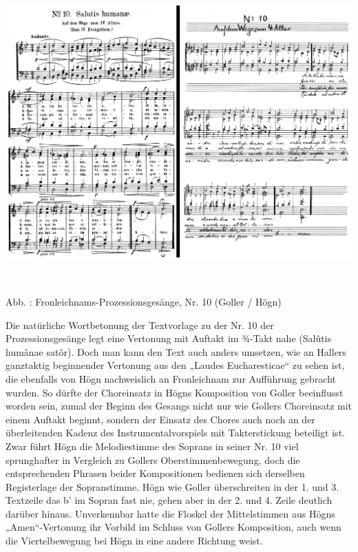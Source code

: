 \documentclass[a4paper]{article}
\newcounter{Abb}
\renewcommand\theAbb{\arabic{Abb}}
\begin{document}
\includegraphics[width=15.967cm,height=11.599cm]{pictures/zulassungsarbeit-img084.png}


Abb. \stepcounter{Abb}{\theAbb}: Fronleichnams-Prozessionsgesänge, Nr.
10 (Goller / Högn)

Die natürliche Wortbetonung der Textvorlage zu der Nr. 10 der
Prozessionsgesänge legt eine Vertonung mit Auftakt im ¾-Takt nahe
(Salûtis humânae satôr). Doch man kann den Text auch anders umsetzen,
wie an Hallers ganztaktig beginnender Vertonung aus den „Laudes
Eucharesticae“ zu sehen ist, die ebenfalls von Högn nachweislich an
Fronleichnam zur Aufführung gebracht wurden. So dürfte der Choreinsatz
in Högns Komposition von Goller beeinflusst worden sein, zumal der
Beginn des Gesangs nicht nur wie Gollers Choreinsatz mit einem Auftakt
beginnt, sondern der Einsatz des Chores auch noch an der überleitenden
Kadenz des Instrumentalvorspiels mit Takterstickung beteiligt ist. Zwar
führt Högn die Melodiestimme des Soprans in seiner Nr. 10 viel
sprunghafter in Vergleich zu Gollers Oberstimmenbewegung, doch die
entsprechenden Phrasen beider Kompositionen bedienen sich derselben
Registerlage der Sopranstimme. Högn wie Goller überschreiten in der 1.
und 3. Textzeile das b’ im Sopran fast nie, gehen aber in der 2. und 4.
Zeile deutlich darüber hinaus. Unverkennbar hatte die Floskel der
Mittelstimmen aus Högns „Amen“-Vertonung ihr Vorbild im Schluss von
Gollers Komposition, auch wenn die Viertelbewegung bei Högn in eine
andere Richtung weist.
\end{document}
